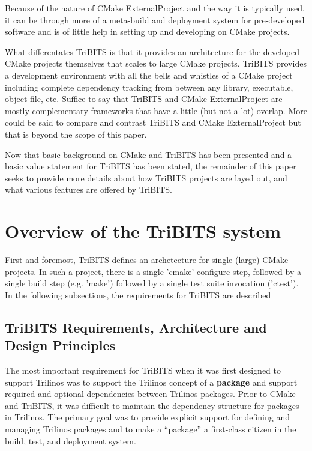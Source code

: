 \documentclass[note]{TechNote}
\begin{document}
Because of the nature of CMake ExternalProject and the way it is typically used, it can be through more of a meta-build and deployment system for pre-developed software and is of little help in setting up and developing on CMake projects.

What differentates TriBITS is that it provides an architecture for the developed CMake projects themselves that scales to large CMake projects.  TriBITS provides a development environment with all the bells and whistles of a CMake project including complete dependency tracking from between any library, executable, object file, etc.  Suffice to say that TriBITS and CMake ExternalProject are mostly complementary frameworks that have a little (but not a lot) overlap.  More could be said to compare and contrast TriBITS and CMake ExternalProject but that is beyond the scope of this paper.

Now that basic background on CMake and TriBITS has been presented and a basic value statement for TriBITS has been stated, the remainder of this paper seeks to provide more details about how TriBITS projects are layed out, and what various features are offered by TriBITS.

%
\section{Overview of the TriBITS system}
%

First and foremost, TriBITS defines an archetecture for single (large) CMake projects.  In such a project, there is a single 'cmake' configure step, followed by a single build step (e.g. 'make') followed by a single test suite invocation ('ctest').  In the following subsections, the requirements for TriBITS are described

%
\subsection{TriBITS Requirements, Architecture and Design Principles}
%

The most important requirement for TriBITS when it was first designed to support Trilinos was to support the Trilinos concept of a \textbf{package} and support required and optional dependencies between Trilinos packages.  Prior to CMake and TriBITS, it was difficult to maintain the dependency structure for packages in Trilinos.  The primary goal was to provide explicit support for defining and managing Trilinos packages and to make a ``package'' a first-class citizen in the build, test, and deployment system.
\end{document}
